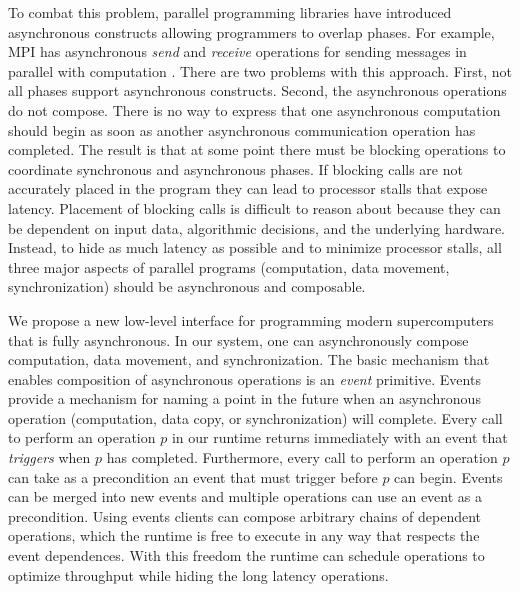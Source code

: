 To combat this problem, parallel programming libraries have introduced
asynchronous constructs allowing programmers to overlap phases.  For
example, MPI has asynchronous {\em send} and {\em receive} operations
for sending messages in parallel with computation \cite{MPI}.  There
are two problems with this approach.  First, not all phases support
asynchronous constructs.  Second, the asynchronous operations do not
compose.  There is no way to express that one asynchronous computation
should begin as soon as another asynchronous communication operation
has completed.  The result is that at some point there must be
blocking operations to coordinate synchronous and asynchronous phases.
If blocking calls are not accurately placed in the program they can
lead to processor stalls that expose latency.  Placement of blocking
calls is difficult to reason about because 
they can be dependent on input data, algorithmic decisions, 
and the underlying hardware.  Instead, to hide as much
latency as possible and to minimize processor stalls, 
all three major aspects of parallel programs (computation, data movement,
synchronization) should be asynchronous and composable.

We propose a new low-level interface for programming modern
supercomputers that is fully asynchronous. In our system, one can
asynchronously compose computation, data movement, and
synchronization.  The basic mechanism that enables composition of 
asynchronous operations
is an {\em event} primitive.  Events provide a mechanism
for naming a point in the future when an asynchronous operation
(computation, data copy, or synchronization) will complete.  Every
call to perform an operation $p$ in our runtime returns immediately
with an event that {\em triggers} when $p$ has completed.
Furthermore, every call to perform an operation $p$ can take as a
precondition an event that must trigger before $p$ can begin.
Events can be merged into new events and multiple operations
can use an event as a precondition.
  Using
events clients can compose arbitrary chains of dependent
operations, which the runtime is free to execute in any way that
respects the event dependences.  With this freedom the runtime can
schedule operations to optimize throughput while hiding the long
latency operations.

